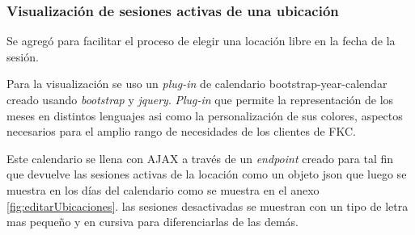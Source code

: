 \subsubsection{Visualización de sesiones activas de una ubicación}

Se agregó para facilitar el proceso de elegir una locación libre en la fecha de la sesión.

Para la visualización se uso un \emph{plug-in} de calendario bootstrap-year-calendar creado usando \emph{bootstrap} y \emph{jquery}. \emph{Plug-in} que permite la representación de los meses en distintos lenguajes asi como la personalización de sus colores, aspectos necesarios para el amplio rango de necesidades de los clientes de FKC.

Este calendario se llena con AJAX a través de un \emph{endpoint} creado para tal fin que devuelve las sesiones activas de la locación como un objeto json que luego se muestra en los días del calendario como se muestra en el anexo \ref{fig:editarUbicaciones}. las sesiones desactivadas se muestran con un tipo de letra mas pequeño y en cursiva para diferenciarlas de las demás.

